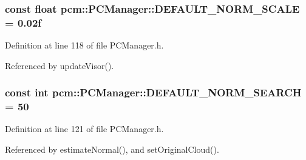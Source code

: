 \hypertarget{classpcm_1_1PCManager_a95ec8d073d4a573b550a44031f986608}{
\subsubsection[{D\-E\-F\-A\-U\-L\-T\-\_\-\-N\-O\-R\-M\-\_\-\-S\-C\-A\-L\-E}]{\setlength{\rightskip}{0pt plus 5cm}const float pcm\-::\-P\-C\-Manager\-::\-D\-E\-F\-A\-U\-L\-T\-\_\-\-N\-O\-R\-M\-\_\-\-S\-C\-A\-L\-E = 0.\-02f\hspace{0.3cm}{\ttfamily [static]}}}\label{classpcm_1_1PCManager_a95ec8d073d4a573b550a44031f986608}


Definition at line 118 of file P\-C\-Manager.\-h.



Referenced by update\-Visor().

\hypertarget{classpcm_1_1PCManager_a507973d100aef370fd7a2feeda4fb273}{
\subsubsection[{D\-E\-F\-A\-U\-L\-T\-\_\-\-N\-O\-R\-M\-\_\-\-S\-E\-A\-R\-C\-H}]{\setlength{\rightskip}{0pt plus 5cm}const int pcm\-::\-P\-C\-Manager\-::\-D\-E\-F\-A\-U\-L\-T\-\_\-\-N\-O\-R\-M\-\_\-\-S\-E\-A\-R\-C\-H = 50\hspace{0.3cm}{\ttfamily [static]}}}\label{classpcm_1_1PCManager_a507973d100aef370fd7a2feeda4fb273}


Definition at line 121 of file P\-C\-Manager.\-h.



Referenced by estimate\-Normal(), and set\-Original\-Cloud().

